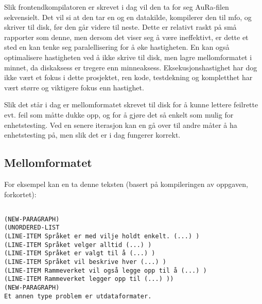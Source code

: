 \documentclass[11pt]{article}
\begin{document}
Slik frontendkompilatoren er skrevet i dag vil den ta for seg AuRa-filen sekvensielt. Det vil si at den tar en og en datakilde, kompilerer den til mfo, og skriver til disk, før den går videre til neste. Dette er relativt raskt på små rapporter som denne, men dersom det viser seg å være ineffektivt, er dette et sted en kan tenke seg paralellisering for å øke hastigheten. En kan også optimalisere hastigheten ved å ikke skrive til disk, men lagre mellomformatet i minnet, da diskaksess er tregere enn minneaksess. Eksekusjonshastighet har dog ikke vært et fokus i dette prosjektet, ren kode, testdekning og kompletthet har vært større og viktigere fokus enn hastighet.



Slik det står i dag er mellomformatet skrevet til disk for å kunne lettere feilrette evt. feil som måtte dukke opp, og for å gjøre det så enkelt som mulig for enhetstesting. Ved en senere iterasjon kan en gå over til andre måter å ha enhetstesting på, men slik det er i dag fungerer korrekt.



\subsection{Mellomformatet}



For eksempel kan en ta denne teksten (basert på kompileringen av oppgaven, forkortet):

\begin{lstlisting}

(NEW-PARAGRAPH)
(UNORDERED-LIST
(LINE-ITEM Språket er med vilje holdt enkelt. (...) )
(LINE-ITEM Språket velger alltid (...) )
(LINE-ITEM Språket er valgt til å (...) )
(LINE-ITEM Språket vil beskrive hver (...) )
(LINE-ITEM Rammeverket vil også legge opp til å (...) )
(LINE-ITEM Rammeverket legger opp til (...) ))
(NEW-PARAGRAPH)
Et annen type problem er utdataformater.

\end{lstlisting}
\end{document}
